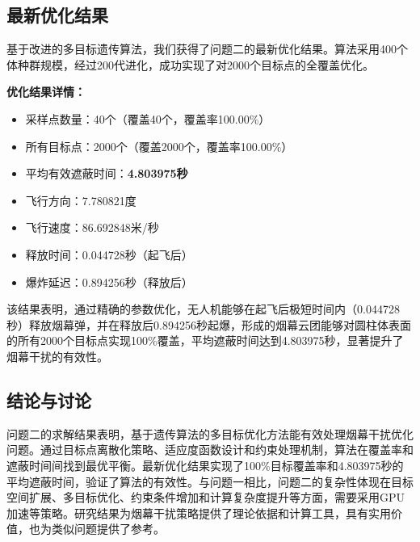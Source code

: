 \subsection{最新优化结果}

基于改进的多目标遗传算法，我们获得了问题二的最新优化结果。算法采用400个体种群规模，经过200代进化，成功实现了对2000个目标点的全覆盖优化。

\textbf{优化结果详情：}
\begin{itemize}
\item 采样点数量：40个（覆盖40个，覆盖率100.00\%）
\item 所有目标点：2000个（覆盖2000个，覆盖率100.00\%）
\item 平均有效遮蔽时间：\textbf{4.803975秒}
\item 飞行方向：7.780821度
\item 飞行速度：86.692848米/秒
\item 释放时间：0.044728秒（起飞后）
\item 爆炸延迟：0.894256秒（释放后）
\end{itemize}

该结果表明，通过精确的参数优化，无人机能够在起飞后极短时间内（0.044728秒）释放烟幕弹，并在释放后0.894256秒起爆，形成的烟幕云团能够对圆柱体表面的所有2000个目标点实现100\%覆盖，平均遮蔽时间达到4.803975秒，显著提升了烟幕干扰的有效性。

\subsection{结论与讨论}

问题二的求解结果表明，基于遗传算法的多目标优化方法能有效处理烟幕干扰优化问题。通过目标点离散化策略、适应度函数设计和约束处理机制，算法在覆盖率和遮蔽时间间找到最优平衡。最新优化结果实现了100\%目标覆盖率和4.803975秒的平均遮蔽时间，验证了算法的有效性。与问题一相比，问题二的复杂性体现在目标空间扩展、多目标优化、约束条件增加和计算复杂度提升等方面，需要采用GPU加速等策略。研究结果为烟幕干扰策略提供了理论依据和计算工具，具有实用价值，也为类似问题提供了参考。
